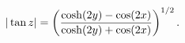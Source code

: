 \[|\mathop{\tan\/}\nolimits z|=\left(\frac{\mathop{\cosh\/}\nolimits\!\left(2y%
\right)-\mathop{\cos\/}\nolimits\!\left(2x\right)}{\mathop{\cosh\/}\nolimits\!%
\left(2y\right)+\mathop{\cos\/}\nolimits\!\left(2x\right)}\right)^{1/2}.\]